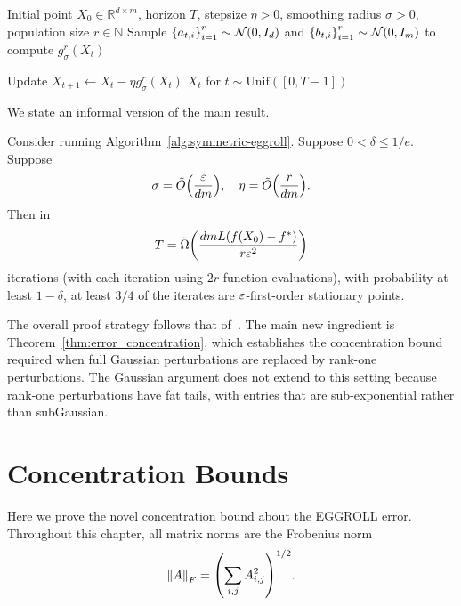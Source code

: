 \begin{algorithm}[H]
\caption{Population-\(r\) Symmetric EGGROLL}
\label{alg:symmetric-eggroll}
\begin{algorithmic}
    \Require Initial point \(X_0 \in \mathbb R^{d\times m}\), horizon \(T\), stepsize \(\eta>0\), smoothing radius \(\sigma>0\), population size \(r\in \mathbb N\)
        \State Sample $\left\{a_{t,i}\right\}_{i=1}^r \sim \mathcal N(0,I_d)$ and $\left\{b_{t,i}\right\}_{i=1}^r \sim \mathcal N(0,I_m)$ to compute $g_\sigma^r(X_t)$
            
        \State Update $X_{t+1}
            \gets
            X_t-\eta g_\sigma^r(X_t)$
    \EndFor
    \State \Return $X_t$ for $t \sim \mathrm{Unif}([0, T-1])$
\end{algorithmic}
\end{algorithm}

We state an informal version of the main result.
\begin{theorem}[informal]
    Consider running Algorithm~\ref{alg:symmetric-eggroll}. Suppose $0 < \delta \leq 1/e$. Suppose
    \begin{align*}
        \sigma = \tilde{O}\qty(\frac{\varepsilon}{dm}), \quad \eta = \tilde{O}\qty(\frac{r}{dm}).
    \end{align*}
    Then in
    \begin{align*}
        T = \tilde{\Omega}\qty(\frac{dmL(f(X_0) - f^*)}{r \varepsilon^2})
    \end{align*}
    iterations (with each iteration using $2r$ function evaluations), with probability at least $1-\delta$, at least $3/4$ of the iterates are $\varepsilon$-first-order stationary points. 
\end{theorem}

The overall proof strategy follows that of~\citet{ren2023escaping}. The main new ingredient is Theorem~\ref{thm:error_concentration}, which establishes the concentration bound required when full Gaussian perturbations are replaced by rank-one perturbations. The Gaussian argument does not extend to this setting because rank-one perturbations have fat tails, with entries that are sub-exponential rather than subGaussian. 

\section{Concentration Bounds}
Here we prove the novel concentration bound about the EGGROLL error. Throughout this chapter, all matrix norms are the Frobenius norm
\begin{align*}
    \left\lVert A \right\rVert_F = \qty(\sum_{i,j} A_{i,j}^2)^{1/2}.
\end{align*}

